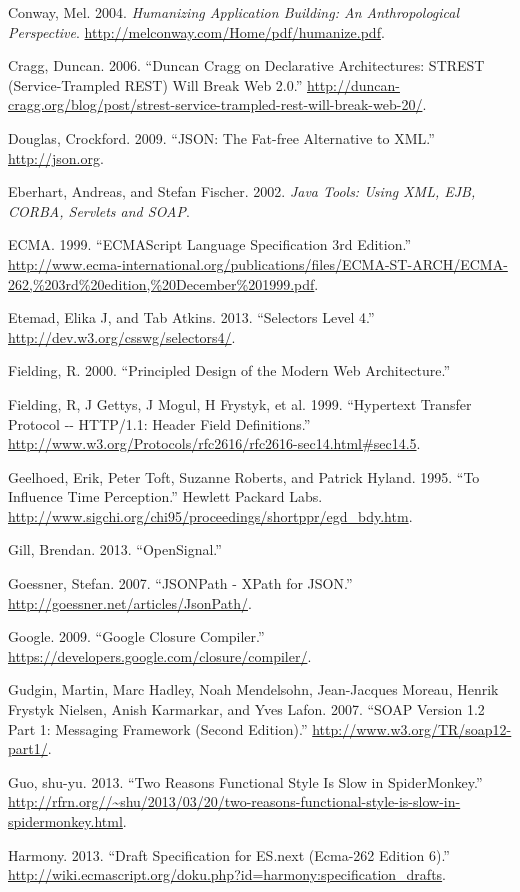 \documentclass[12pt, ]{article}
\begin{document}
Conway, Mel. 2004. \emph{Humanizing Application Building: An
Anthropological Perspective}.
\url{http://melconway.com/Home/pdf/humanize.pdf}.

Cragg, Duncan. 2006. ``Duncan Cragg on Declarative Architectures: STREST
(Service-Trampled REST) Will Break Web 2.0.''
\url{http://duncan-cragg.org/blog/post/strest-service-trampled-rest-will-break-web-20/}.

Douglas, Crockford. 2009. ``JSON: The Fat-free Alternative to XML.''
\url{http://json.org}.

Eberhart, Andreas, and Stefan Fischer. 2002. \emph{Java Tools: Using
XML, EJB, CORBA, Servlets and SOAP}.

ECMA. 1999. ``ECMAScript Language Specification 3rd Edition.''
\url{http://www.ecma-international.org/publications/files/ECMA-ST-ARCH/ECMA-262,\%203rd\%20edition,\%20December\%201999.pdf}.

Etemad, Elika J, and Tab Atkins. 2013. ``Selectors Level 4.''
\url{http://dev.w3.org/csswg/selectors4/}.

Fielding, R. 2000. ``Principled Design of the Modern Web Architecture.''

Fielding, R, J Gettys, J Mogul, H Frystyk, et al. 1999. ``Hypertext
Transfer Protocol -{}- HTTP/1.1: Header Field Definitions.''
\url{http://www.w3.org/Protocols/rfc2616/rfc2616-sec14.html\#sec14.5}.

Geelhoed, Erik, Peter Toft, Suzanne Roberts, and Patrick Hyland. 1995.
``To Influence Time Perception.'' Hewlett Packard Labs.
\url{http://www.sigchi.org/chi95/proceedings/shortppr/egd_bdy.htm}.

Gill, Brendan. 2013. ``OpenSignal.''

Goessner, Stefan. 2007. ``JSONPath - XPath for JSON.''
\url{http://goessner.net/articles/JsonPath/}.

Google. 2009. ``Google Closure Compiler.''
\url{https://developers.google.com/closure/compiler/}.

Gudgin, Martin, Marc Hadley, Noah Mendelsohn, Jean-Jacques Moreau,
Henrik Frystyk Nielsen, Anish Karmarkar, and Yves Lafon. 2007. ``SOAP
Version 1.2 Part 1: Messaging Framework (Second Edition).''
\url{http://www.w3.org/TR/soap12-part1/}.

Guo, shu-yu. 2013. ``Two Reasons Functional Style Is Slow in
SpiderMonkey.''
\url{http://rfrn.org//~shu/2013/03/20/two-reasons-functional-style-is-slow-in-spidermonkey.html}.

Harmony. 2013. ``Draft Specification for ES.next (Ecma-262 Edition 6).''
\url{http://wiki.ecmascript.org/doku.php?id=harmony:specification_drafts}.
\end{document}
